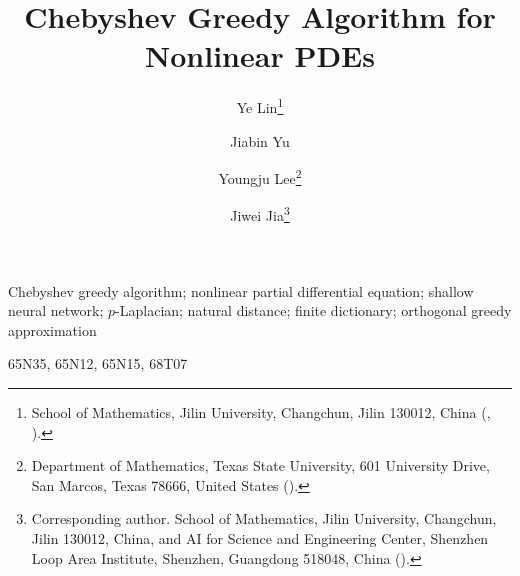 \documentclass[review,hidelinks,onefignum,onetabnum,nohypdvips]{siamart251216}
\title{Chebyshev Greedy Algorithm for Nonlinear PDEs}
\author{Ye Lin\thanks{\raggedright School of Mathematics, Jilin University, Changchun, Jilin 130012, China (\email{linye21@mails.jlu.edu.cn}, \email{yujb25@mails.jlu.edu.cn}).}
\and Jiabin Yu\footnotemark[1]
\and Youngju Lee\thanks{\raggedright Department of Mathematics, Texas State University, 601 University Drive, San Marcos, Texas 78666, United States (\email{yjlee@txstate.edu}).}
\and Jiwei Jia\thanks{\raggedright Corresponding author. School of Mathematics, Jilin University, Changchun, Jilin 130012, China, and AI for Science and Engineering Center, Shenzhen Loop Area Institute, Shenzhen, Guangdong 518048, China (\email{jiajiwei@jlu.edu.cn}).}}
\begin{document}
\maketitle



\begin{keywords}
Chebyshev greedy algorithm; nonlinear partial differential equation; shallow neural network;
$p$-Laplacian; natural distance; finite dictionary; orthogonal greedy approximation
\end{keywords}

\begin{MSCcodes}
65N35, 65N12, 65N15, 68T07
\end{MSCcodes}




\def\CGAChapterFiveEmbedded{1}







\begingroup
\renewcommand{\url}[1]{}

\endgroup
\end{document}
